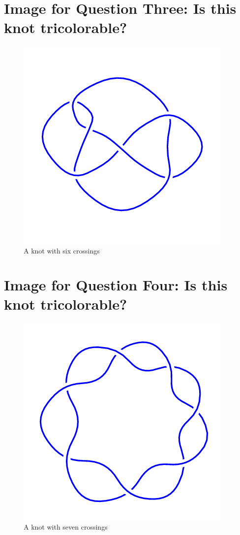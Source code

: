 \documentclass[12pt,letterpaper]{article}
\theoremstyle{definition}
\begin{document}
\clearpage

\section*{Image for Question Three: Is this knot tricolorable?}

\begin{figure}[h]
    \centering
    \includegraphics[width=.45\textwidth]{knotpics/6_3.png}
    \caption{A knot with six crossings}
\end{figure}


\section*{Image for Question Four: Is this knot tricolorable?}

\begin{figure}[h]
    \centering
    \includegraphics[width=.45\textwidth]{knotpics/7_1.png}
    \caption{A knot with seven crossings}
\end{figure}
\end{document}
